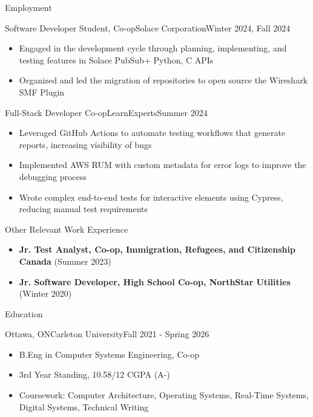\documentclass[]{mcdowellcv}
\begin{document}
	\begin{cvsection}{Employment}
		
	\begin{cvsubsection}{Software Developer Student, Co-op}{Solace Corporation}{Winter 2024, Fall 2024}			
		\begin{itemize}
			\item Engaged in the development cycle through planning, implementing, and testing features in Solace PubSub+ Python, C APIs
			\item Organized and led the migration of repositories to open source the Wireshark SMF Plugin
		\end{itemize}
	\end{cvsubsection}

	\begin{cvsubsection}{Full-Stack Developer Co-op}{LearnExperts}{Summer 2024}			
		\begin{itemize}
			\item Leveraged GitHub Actions to automate testing workflows that generate reports, increasing visibility of bugs
			\item Implemented AWS RUM with custom metadata for error logs to improve the debugging process
			\item Wrote complex end-to-end tests for interactive elements using Cypress, reducing manual test requirements
		\end{itemize}
	\end{cvsubsection}

	\begin{cvsubsection}{Other Relevant Work Experience}{}{}
		\begin{itemize}
			\item \textbf{Jr. Test Analyst, Co-op, Immigration, Refugees, and Citizenship Canada} (Summer 2023)
			\item \textbf{Jr. Software Developer, High School Co-op, NorthStar Utilities} (Winter 2020)
		\end{itemize}
	\end{cvsubsection}
	\end{cvsection}

	\begin{cvsection}{Education}
		\begin{cvsubsection}{Ottawa, ON}{Carleton University}{Fall 2021 - Spring 2026}
			\begin{itemize}
				\item B.Eng in Computer Systems Engineering, Co-op
				\item 3rd Year Standing, 10.58/12 CGPA (A-)
				\item Coursework: Computer Architecture, Operating Systems, Real-Time Systems, Digital Systems, Technical Writing
			\end{itemize}
		\end{cvsubsection}
	\end{cvsection}
	
\end{document}
